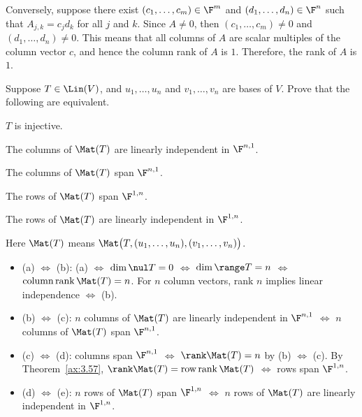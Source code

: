 \begin{exc}
\begin{solution}
Conversely, suppose there exist $(c_1,\dots,c_m)\in\F^m$ and
$(d_1,\dots,d_n)\in\F^n$ such that $A_{j,k}=c_jd_k$ for all $j$ and $k$. Since
$A\ne0$, then $(c_1,\dots,c_m)\ne0$ and $(d_1,\dots,d_n)\ne0$. This means that
all columns of $A$ are scalar multiples of the column vector $c$, and hence the
column rank of $A$ is $1$. Therefore, the rank of $A$ is $1$.
\end{solution}

\begin{exercise}
Suppose $T\in\Lin(V)$, and $u_1,\dots,u_n$ and $v_1,\dots,v_n$ are bases of
$V$. Prove that the following are equivalent.
\begin{parts}
\item $T$ is injective.
\item The columns of $\Mat(T)$ are linearly independent in $\F^{n,1}$.
\item The columns of $\Mat(T)$ span $\F^{n,1}$.
\item The rows of $\Mat(T)$ span $\F^{1,n}$.
\item The rows of $\Mat(T)$ are linearly independent in $\F^{1,n}$.
\end{parts}
Here $\Mat(T)$ means $\Mat\bigl(T,(u_1,\dots,u_n),(v_1,\dots,v_n)\bigr)$.
\end{exercise}
\begin{solution}\leavevmode
\begin{itemize}
\item (a) $\iff$ (b): (a) $\iff$ $\dim\nul T=0$ $\iff$ $\dim\range T=n$
  $\iff$ $\operatorname{column\,rank}\Mat(T)=n$. For $n$ column vectors,
  rank $n$ implies linear independence $\iff$ (b).
\item (b) $\iff$ (c): $n$ columns of $\Mat(T)$ are linearly independent in
  $\F^{n,1}$ $\iff$ $n$ columns of $\Mat(T)$ span $\F^{n,1}$.
\item (c) $\iff$ (d): columns span $\F^{n,1}$ $\iff$ $\rank\Mat(T)=n$ by
  (b) $\iff$ (c). By Theorem~\ref{ax:3.57},
  $\rank\Mat(T)=\operatorname{row\,rank}\Mat(T)$ $\iff$ rows span $\F^{1,n}$.
\item (d) $\iff$ (e): $n$ rows of $\Mat(T)$ span $\F^{1,n}$ $\iff$ $n$ rows of
  $\Mat(T)$ are linearly independent in $\F^{1,n}$.
\end{itemize}
\end{solution}
\end{exc}

